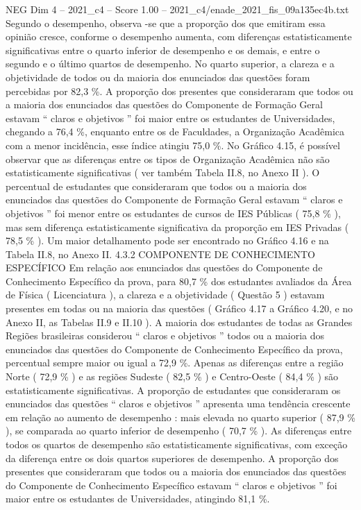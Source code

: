 \begin{textsample}{NEG Dim 4 – 2021\_c4 – Score 1.00 – 2021\_c4/enade\_2021\_fis\_09a135ec4b.txt}
Segundo o desempenho, observa -se que a proporção dos que emitiram essa opinião cresce, conforme o desempenho aumenta, com diferenças estatisticamente significativas entre o quarto inferior de desempenho e os demais, e entre o segundo e o último quartos de desempenho.
No quarto superior, a clareza e a objetividade de todos ou da maioria dos enunciados das questões foram percebidas por 82,3 \%.
A proporção dos presentes que consideraram que todos ou a maioria dos enunciados das questões do Componente de Formação Geral estavam “ claros e objetivos ” foi maior entre os estudantes de Universidades, chegando a 76,4 \%, enquanto entre os de Faculdades, a Organização Acadêmica com a menor incidência, esse índice atingiu 75,0 \%.
No Gráfico 4.15, é possível observar que as diferenças entre os tipos de Organização Acadêmica não são estatisticamente significativas ( ver também Tabela II.8, no Anexo II ).
O percentual de estudantes que consideraram que todos ou a maioria dos enunciados das questões do Componente de Formação Geral estavam “ claros e objetivos ” foi menor entre os estudantes de cursos de IES Públicas ( 75,8 \% ), mas sem diferença estatisticamente significativa da proporção em IES Privadas ( 78,5 \% ).
Um maior detalhamento pode ser encontrado no Gráfico 4.16 e na Tabela II.8, no Anexo II. 4.3.2 COMPONENTE DE CONHECIMENTO ESPECÍFICO Em relação aos enunciados das questões do Componente de Conhecimento Específico da prova, para 80,7 \% dos estudantes avaliados da Área de Física ( Licenciatura ), a clareza e a objetividade ( Questão 5 ) estavam presentes em todas ou na maioria das questões ( Gráfico 4.17 a Gráfico 4.20, e no Anexo II, as Tabelas II.9 e II.10 ).
A maioria dos estudantes de todas as Grandes Regiões brasileiras considerou “ claros e objetivos ” todos ou a maioria dos enunciados das questões do Componente de Conhecimento Específico da prova, percentual sempre maior ou igual a 72,9 \%.
Apenas as diferenças entre a região Norte ( 72,9 \% ) e as regiões Sudeste ( 82,5 \% ) e Centro-Oeste ( 84,4 \% ) são estatisticamente significativas.
A proporção de estudantes que consideraram os enunciados das questões “ claros e objetivos ” apresenta uma tendência crescente em relação ao aumento de desempenho : mais elevada no quarto superior ( 87,9 \% ), se comparada ao quarto inferior de desempenho ( 70,7 \% ).
As diferenças entre todos os quartos de desempenho são estatisticamente significativas, com exceção da diferença entre os dois quartos superiores de desempenho.
A proporção dos presentes que consideraram que todos ou a maioria dos enunciados das questões do Componente de Conhecimento Específico estavam “ claros e objetivos ” foi maior entre os estudantes de Universidades, atingindo 81,1 \%.

\end{textsample}
